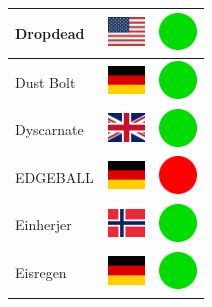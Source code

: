 \documentclass[12pt, a4paper, twoside]{report}
\begin{document}
\begin{center}
\begin{longtable}{|p{5cm}|p{2cm}|p{2cm}|}
Dropdead & \includegraphics[width=1cm]{4x3/us} & \includegraphics[width=1cm]{likes/y} \\ \hline
Dust Bolt & \includegraphics[width=1cm]{4x3/de} & \includegraphics[width=1cm]{likes/y} \\ \hline
Dyscarnate & \includegraphics[width=1cm]{4x3/gb} & \includegraphics[width=1cm]{likes/y} \\ \hline
EDGEBALL & \includegraphics[width=1cm]{4x3/de} & \includegraphics[width=1cm]{likes/n} \\ \hline
Einherjer & \includegraphics[width=1cm]{4x3/no} & \includegraphics[width=1cm]{likes/y} \\ \hline
Eisregen & \includegraphics[width=1cm]{4x3/de} & \includegraphics[width=1cm]{likes/y} \\ \hline

\end{longtable}
\end{center}
\end{document}
